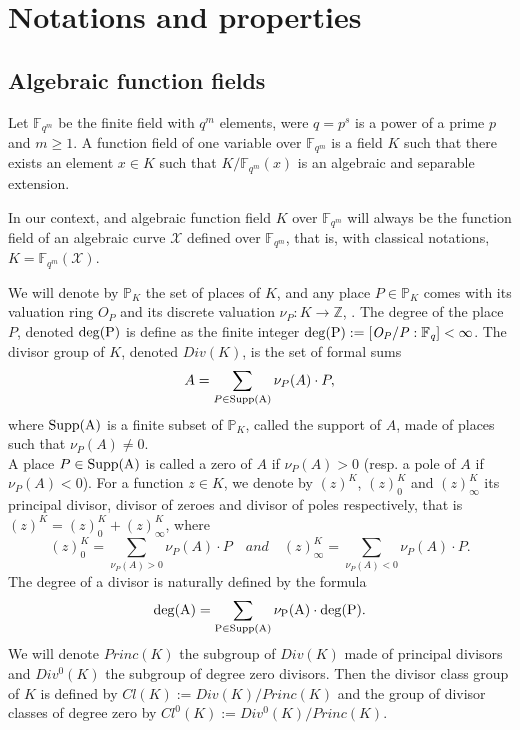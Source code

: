 \documentclass[10pt]{article}
\newcommand{\s}{\vspace{0.3cm}}
\newcommand{\cd}{\cdot}
\newcommand{\Z}{\mathbb{Z}}
\newcommand{\fqm}{\mathbb{F}_{q^m}}
\newcommand{\fq}{\mathbb{F}_q}
\newcommand{\X}{\mathcal{X}}
\begin{document}
\s

\section{Notations and properties}

\s

\subsection{Algebraic function fields}

\s


Let $\fqm$ be the finite field with $q^m$ elements, were $q=p^s$ is a power of a prime $p$ and $m \geq 1$. A function field of one variable over $\fqm$ is a field $K$ such that there exists an element $x\in K$ such that $K/\fqm(x)$ is an algebraic and separable extension. 

In our context, and algebraic function field $K$ over $\fqm$ will always be the function field of an algebraic curve $\X$ defined over $\fqm$, that is, with classical notations, $K = \fqm(\X)$.

We will denote by $\mathbb{P}_K$ the set of places of $K$, and any place $P \in \mathbb{P}_K$ comes with its valuation ring $O_P$ and its discrete valuation $\nu_P : K \rightarrow \Z$, . The degree of the place $P$, denoted $\rm{deg}(P)$ is define as the finite integer $\rm{deg}(P) := \it [O_P/P:\fq] < \infty$.
The divisor group of $K$, denoted $Div(K)$, is the set of formal sums 
\[A = \sum\limits_{P \in \rm{Supp}(A)} \nu_P(A) \cd P,\]
where $\rm{Supp}(A)$ is a finite subset of $\mathbb{P}_K$, called the support of $A$, made of places such that $\nu_{P}(A) \neq 0$. \\ A place  $P \in \rm{Supp}(A)$ is called a zero of $A$ if $\nu_P(A) >0$ (resp. a pole of $A$ if $\nu_P(A) < 0$). For a function $z \in K$, we denote by $(z)^K$, $(z)^K_0$ and $(z)^K_{\infty}$ its principal divisor, divisor of zeroes and divisor of poles respectively, that is $(z)^K = (z)^K_0 + (z)^K_{\infty}$, where 
\[(z)^K_0 = \sum\limits_{\nu_P(A) > 0}\nu_P(A) \cd P \quad and \quad (z)^K_{\infty} = \sum\limits_{\nu_P(A) < 0}\nu_P(A) \cd P.\]
The degree of a divisor is naturally defined by the formula
\[\rm{deg}(A) = \sum\limits_{P \in \rm{Supp}(A)} \nu_P(A) \cd \rm{deg}(P).\]
\s
We will denote $Princ(K)$ the subgroup of $Div(K)$ made of principal divisors and $Div^0(K)$ the subgroup of degree zero divisors. Then the divisor class group of $K$ is defined by $Cl(K):=Div(K)/Princ(K)$ and the group of divisor classes of degree zero by $Cl^0(K):=Div^0(K)/Princ(K)$. 
\end{document}
